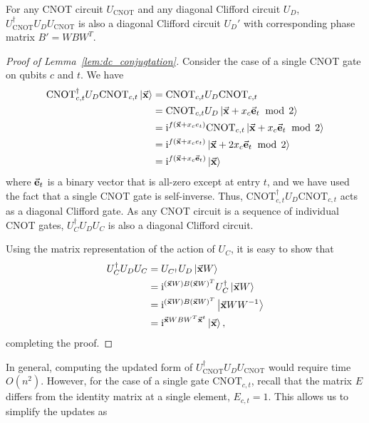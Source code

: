 \begin{lem}
For any CNOT circuit $U_{\text{CNOT}}$ and any diagonal Clifford circuit $U_{D}$, $U_{\text{CNOT}}^{\dagger}U_{D}U_{\text{CNOT}}$ is also a diagonal Clifford circuit $U_{D}'$ with corresponding phase matrix $B'=WBW^{T}$.\label{lem:dc_conjugtation}
\end{lem}
\begin{proof}[Proof of Lemma~\ref{lem:dc_conjugtation}]
Consider the case of a single CNOT gate on qubits $c$ and $t$. We have
\begin{align}
\text{CNOT}_{c,t}^{\dagger} U_{D} \text{CNOT}_{c,t}\ket{\va{x}} &= \text{CNOT}_{c,t} U_{D} \text{CNOT}_{c,t} \nonumber \\
&= \text{CNOT}_{c,t} U_{D} \ket{\va{x} + x_{c}\va{e}_{t}\;\bmod\,2} \nonumber \\
&= \mathrm{i}^{f(\va{x} + x_{c}e_{t})} \text{CNOT}_{c,t} \ket{\va{x} + x_{c}\va{e}_{t}\;\bmod\,2} \nonumber \\
&= \mathrm{i}^{f(\va{x} + x_{c}e_{t})} \ket{\va{x} + 2x_{c}\va{e}_{t}\;\bmod\,2} \nonumber \\
&= \mathrm{i}^{f(\va{x}+x_{c}\va{e}_{t})}\ket{\va{x}}
\end{align}
where $\va{e}_{t}$ is a binary vector that is all-zero except at entry $t$, and we have used the fact that a single CNOT gate is self-inverse. Thus, $\text{CNOT}_{c,t}^{\dagger}U_{D}\text{CNOT}_{c,t}$ acts as a diagonal Clifford gate. As any CNOT circuit is a sequence of individual CNOT gates, $U_{C}^{\dagger}U_{D}U_{C}$ is also a diagonal Clifford circuit.\par
Using the matrix representation of the action of $U_{C}$, it is easy to show that
\begin{align}
U_{C}^{\dagger}U_{D}U_{C} &= U_{C^{\dagger}}U_{D}\ket{\va{x}W} \nonumber \\
&= \mathrm{i}^{(\va{x}W)B(\va{x}W)^{T}}U_{C}^{\dagger}\ket{\va{x}W} \nonumber \\
&= \mathrm{i}^{(\va{x}W)B(\va{x}W)^{T}}\ket{\va{x}WW^{-1}} \nonumber \\
&= \mathrm{i}^{\va{x}WBW^{T}\va{x}^{t}}\ket{\va{x}},
\label{eq:cdc}
\end{align}
completing the proof.
\end{proof}
In general, computing the updated form of $U_{\text{CNOT}}^{\dagger}U_{D}U_{\text{CNOT}}$ would require time $O(n^{2})$. However, for the case of a single gate $\text{CNOT}_{c,t}$, recall that the matrix $E$ differs from the identity matrix at a single element, $E_{c,t}=1$. This allows us to simplify the updates as
